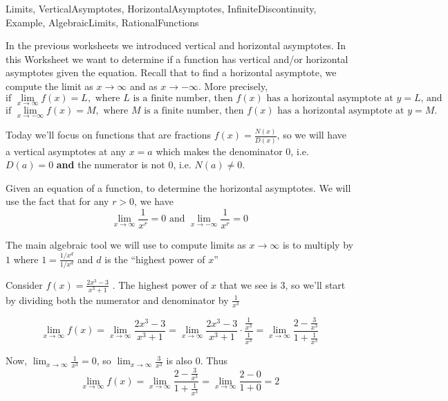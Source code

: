 
\begin{tagblock}{Limits, VerticalAsymptotes, HorizontalAsymptotes, InfiniteDiscontinuity, Example, AlgebraicLimits, RationalFunctions}
\begin{question}
	
\bigskip

In the previous worksheets we introduced vertical and horizontal asymptotes.  In this Worksheet we want to determine if a function has vertical and/or horizontal asymptotes given the equation.  Recall that to find a horizontal asymptote, we compute the limit as $x \to \infty$ and as $x \to -\infty$.  More precisely, 
\[ \text{if } \lim_{x \to \infty} f(x) = L, \text{ where $L$ is a finite number, then $f(x)$ has a horizontal asymptote at $y=L$, and} \]
\[ \text{if } \lim_{x \to -\infty} f(x) = M, \text{ where $M$ is a finite number, then $f(x)$ has a horizontal asymptote at $y=M$.} \]

Today we'll focus on functions that are fractions $\displaystyle f(x) = \frac{N(x)}{D(x)}$, so we will have a vertical asymptotes at any $x=a$ which makes  the denominator $0$, i.e. $D(a)=0$ \textbf{and}  the numerator is not $0$, i.e. $N(a)\neq 0$.  

Given an equation of a function, to determine the horizontal asymptotes.  We will use the fact that for any $r>0$, we have
\[ \lim_{x \to \infty} \frac{1}{x^r} = 0 \text{ and }  \lim_{x \to -\infty} \frac{1}{x^r} = 0 \]

The main algebraic tool we will use to compute limits as $x \to \infty$ is to multiply by $1$ where $1=\frac{1/x^d}{1/x^d}$ and $d$ is the ``highest power of $x$''

 Consider $\displaystyle f(x) = \frac{2x^3-3}{x^3+1}$ .  The highest power of $x$ that we see is $3$, so we'll start by dividing both the numerator and denominator by $\frac{1}{x^3}$
 
 \[ \lim_{x \to \infty} f(x) =  \lim_{x \to \infty} \frac{2x^3-3}{x^3+1} =  \lim_{x \to \infty} \frac{2x^3-3}{x^3+1} \cdot \frac{\frac{1}{x^3}}{\frac{1}{x^3}} = \lim_{x \to \infty} \frac{2-\frac{3}{x^3}}{1+\frac{1}{x^3}}\]

Now, $\lim_{x \to \infty} \frac{1}{x^3} =0$, so  $\lim_{x \to \infty} \frac{3}{x^3}$ is also $0$.  Thus 
\[\lim_{x \to \infty} f(x) =  \lim_{x \to \infty} \frac{2-\frac{3}{x^3}}{1+\frac{1}{x^3}} =  \lim_{x \to \infty} \frac{2-0}{1+0} = 2 \]


\end{question}
\end{tagblock}
